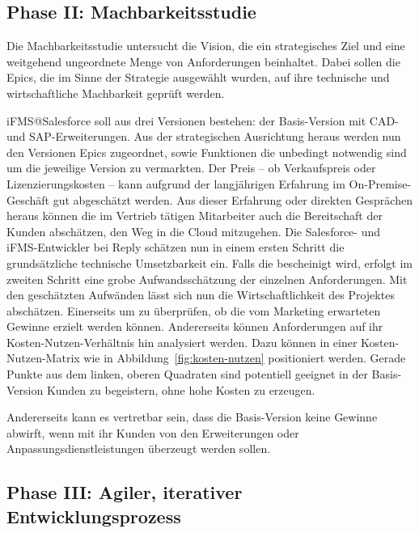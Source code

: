 \subsection{Phase II: Machbarkeitsstudie}
Die Machbarkeitsstudie untersucht die Vision, die ein strategisches Ziel und 
eine weitgehend ungeordnete Menge von Anforderungen beinhaltet. Dabei sollen 
die Epics, die im Sinne der Strategie ausgewählt wurden, auf ihre technische 
und wirtschaftliche Machbarkeit geprüft werden.

iFMS@Salesforce soll aus drei Versionen bestehen: der Basis-Version mit CAD- 
und SAP-Erweiterungen. Aus der strategischen Ausrichtung heraus werden nun den 
Versionen Epics zugeordnet, sowie Funktionen die unbedingt notwendig sind um 
die jeweilige Version zu vermarkten. Der Preis -- ob Verkaufspreis oder 
Lizenzierungskosten -- kann aufgrund der langjährigen Erfahrung im 
On-Premise-Geschäft gut abgeschätzt werden. Aus dieser Erfahrung oder direkten 
Gesprächen heraus können die im Vertrieb tätigen Mitarbeiter auch die 
Bereitschaft der Kunden abschätzen, den Weg in die Cloud mitzugehen. Die 
Salesforce- und iFMS-Entwickler bei Reply schätzen nun in einem ersten Schritt 
die grundsätzliche technische Umsetzbarkeit ein. Falls die bescheinigt wird, 
erfolgt im zweiten Schritt eine grobe Aufwandsschätzung der einzelnen 
Anforderungen. Mit den geschätzten Aufwänden lässt sich nun die 
Wirtschaftlichkeit des Projektes abschätzen. Einerseits um zu überprüfen, ob 
die vom Marketing erwarteten Gewinne erzielt werden können. Andererseits können 
Anforderungen auf ihr Kosten-Nutzen-Verhältnis hin analysiert werden. Dazu 
können in einer Kosten-Nutzen-Matrix wie in Abbildung~\ref{fig:kosten-nutzen} 
positioniert werden. Gerade Punkte aus dem linken, oberen Quadraten sind 
potentiell geeignet in der Basis-Version Kunden zu begeistern, ohne hohe Kosten 
zu erzeugen. 
	
Andererseits kann es vertretbar sein, dass die Basis-Version keine Gewinne 
abwirft, wenn mit ihr Kunden von den Erweiterungen oder 
Anpassungsdienstleistungen überzeugt werden sollen.

\subsection{Phase III: Agiler, iterativer Entwicklungsprozess}

